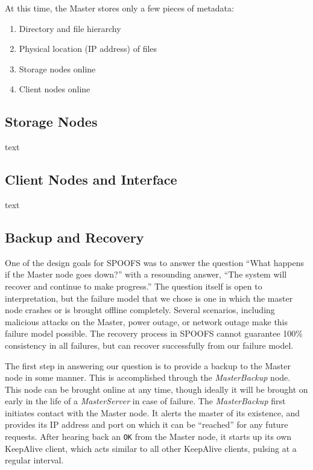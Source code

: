 At this time, the Master stores only a few pieces of metadata:
\begin{enumerate}
\item Directory and file hierarchy
\item Physical location (IP address) of files
\item Storage nodes online
\item Client nodes online
\end{enumerate}


\subsection{Storage Nodes}

text

\subsection{Client Nodes and Interface}

text

\subsection{Backup and Recovery}

One of the design goals for SPOOFS was to answer the question ``What happens if the Master node goes down?'' with a resounding answer, ``The system will recover and continue to make progress.''  The question itself is open to interpretation, but the failure model that we chose is one in which the master node crashes or is brought offline completely.  Several scenarios, including malicious attacks on the Master, power outage, or network outage make this failure model possible.  The recovery process in SPOOFS cannot guarantee 100\% consistency in all failures, but can recover successfully from our failure model.

The first step in answering our question is to provide a backup to the Master node in some manner.  This is accomplished through the \textit{MasterBackup} node.  This node can be brought online at any time, though ideally it will be brought on early in the life of a \textit{MasterServer} in case of failure.  The \textit{MasterBackup} first initiates contact with the Master node.  It alerts the master of its existence, and provides its IP address and port on which it can be ``reached'' for any future requests.  After hearing back an \texttt{OK} from the Master node, it starts up its own KeepAlive client, which acts similar to all other KeepAlive clients, pulsing at a regular interval.

